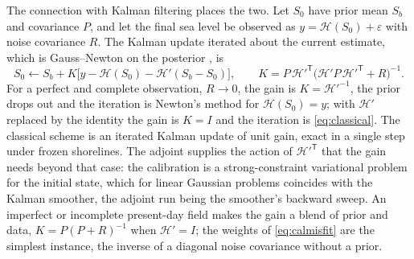 \documentclass[11pt,a4paper]{article}
\numberwithin{equation}{section}
\begin{document}
The connection with Kalman filtering places the two. Let $S_{0}$ have prior
mean $S_{b}$ and covariance $P$, and let the final sea level be observed as
$y = \mathcal{H}(S_{0}) + \varepsilon$ with noise covariance $R$. The Kalman
update iterated about the current estimate, which is Gauss--Newton on the
posterior \citep{BellCathey1993}, is
\begin{equation}
S_{0} \leftarrow S_{b} + K\big[y - \mathcal{H}(S_{0}) - \mathcal{H}'(S_{b}-S_{0})\big],
\qquad
K = P\,\mathcal{H}'^{\mathsf T}\big(\mathcal{H}'P\,\mathcal{H}'^{\mathsf T} + R\big)^{-1}.
\end{equation}
For a perfect and complete observation, $R\to0$, the gain is
$K = \mathcal{H}'^{-1}$, the prior drops out and the iteration is Newton's
method for $\mathcal{H}(S_{0}) = y$; with $\mathcal{H}'$ replaced by the identity
the gain is $K = I$ and the iteration is \eqref{eq:classical}. The classical
scheme is an iterated Kalman update of unit gain, exact in a single step
under frozen shorelines. The adjoint supplies the action of $\mathcal{H}'^{\mathsf T}$ that the
gain needs beyond that case: the calibration is a strong-constraint
variational problem for the initial state, which for linear Gaussian problems
coincides with the Kalman smoother, the adjoint run being the smoother's
backward sweep. An imperfect or incomplete present-day field makes the gain a
blend of prior and data, $K = P(P+R)^{-1}$ when $\mathcal{H}' = I$; the weights
of \eqref{eq:calmisfit} are the simplest instance, the inverse of a diagonal
noise covariance without a prior.



\end{document}
